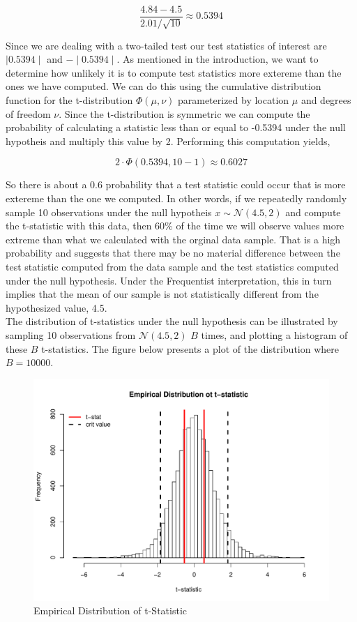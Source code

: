 \documentclass[12pt]{article}
\begin{document}
$$
\frac{4.84-4.5}{2.01/\sqrt{10}} \approx 0.5394
$$

\noindent Since we are dealing with a two-tailed test our test statistics of interest are $\mid 0.5394 \mid$ and $-\mid 0.5394 \mid$. As mentioned in the introduction, we want to determine how unlikely it is to compute test statistics more extereme than the ones we have computed. We can do this using the cumulative distribution function for the t-distribution $\Phi(\mu, \nu)$ parameterized by location $\mu$ and degrees of freedom $\nu$. Since the t-distribution is symmetric we can compute the probability of calculating a statistic less than or equal to -0.5394 under the null hypotheis and multiply this value by 2. Performing this computation yields,

$$
2 \cdot \Phi(0.5394, 10-1) \approx 0.6027
$$

\noindent So there is about a 0.6 probability that a test statistic could occur that is more extereme than the one we computed. In other words, if we repeatedly randomly sample 10 observations under the null hypotheis $x \sim \mathcal{N}(4.5, 2)$ and compute the t-statistic with this data, then 60\% of the time we will observe values more extreme than what we calculated with the orginal data sample. That is a high probability and suggests that there may be no material difference between the test statistic computed from the data sample and the test statistics computed under the null hypothesis. Under the Frequentist interpretation, this in turn implies that the mean of our sample is not statistically different from the hypothesized value, 4.5. \\

\noindent The distribution of t-statistics under the null hypothesis can be illustrated by sampling 10 observations from $\mathcal{N}(4.5,2)$ $B$ times, and plotting a histogram of these $B$ t-statistics. The figure below presents a plot of the distribution where $B = 10000$.

\begin{figure}[H]\caption[]{Empirical Distribution of t-Statistic}
\centering
\begin{minipage}{0.6\linewidth}
\includegraphics[trim={0cm 0cm 0cm 1.5cm}, clip, scale=0.6]{../figs/ttest_dist.pdf}
\end{minipage}
\end{figure}
\end{document}
